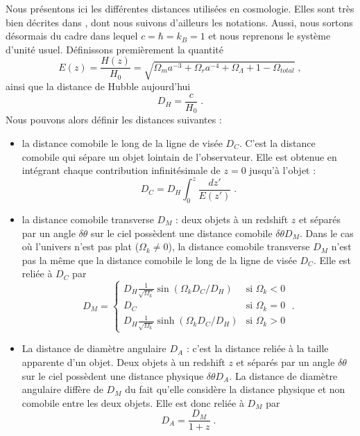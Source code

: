 \documentclass[11pt, twoside, a4paper, openright]{report}
\begin{document}
Nous présentons ici les différentes distances utilisées en cosmologie. Elles sont très bien décrites dans \textcite{Hogg1999}, dont nous suivons d'ailleurs les notations. Aussi, nous sortons désormais du cadre dans lequel $c = \hbar = k_{B} = 1$ et nous reprenons le système d'unité usuel. Définissons premièrement la quantité
\begin{equation}
  \label{eq:dist_ez}
  E(z) = \frac{H(z)}{H_0} 
  = \sqrt{\Omega_m a^{-3} + \Omega_r a^{-4} + \Omega_{\Lambda} + 1 - \Omega_{total}}  \; ,
\end{equation}
ainsi que la distance de Hubble aujourd'hui
\begin{equation}
  \label{eq:dist_hubble}
  D_H = \frac{c}{H_0}  \; .
\end{equation}
Nous pouvons alors définir les distances suivantes :
\begin{itemize}[label=$\bullet$]
\item la distance comobile le long de la ligne de visée $D_{C}$. C'est la distance comobile qui sépare un objet lointain de l'observateur. Elle est obtenue en intégrant chaque contribution infinitésimale de $z=0$ jusqu'à l'objet :
  \begin{equation}
    \label{eq:dist_como}
    D_{C} = D_H \int_0^z \frac{dz'}{E(z')}  \; .
  \end{equation}
\item la distance comobile transverse $D_M$ : deux objets à un redshift $z$ et séparés par un angle $\delta \theta$ sur le ciel possèdent une distance comobile $\delta \theta D_M$.
  Dans le cas où l'univers n'est pas plat ($\Omega_k \neq 0$), la distance comobile transverse $D_M$  n'est pas la même que la distance comobile le long de la ligne de visée $D_{C}$. Elle est reliée à $D_{C}$ par
  \begin{equation}
    \label{eq:dist_como_trans}
    D_M = \left\{
      \begin{array}{ll}
        D_H \frac{1}{\sqrt{\Omega_k}} \sin(\Omega_k D_C / D_H) & \mbox{si } \Omega_k < 0 \\
        D_C & \textrm{si } \Omega_k = 0 \\
        D_H \frac{1}{\sqrt{\Omega_k}} \sinh(\Omega_k D_C / D_H) & \mbox{si } \Omega_k > 0
      \end{array}
    \right. \; .
  \end{equation}
 
\item La distance de diamètre angulaire $D_A$ : c'est la distance reliée à la taille apparente d'un objet. Deux objets à un redshift $z$ et séparés par un angle $\delta \theta$ sur le ciel possèdent une distance physique $\delta \theta D_A$. La distance de diamètre angulaire diffère de $D_M$ du fait qu'elle considère la distance physique et non comobile entre les deux objets. Elle est donc reliée à $D_M$ par
  \begin{equation}
    \label{eq:dist_ang}
    D_A = \frac{D_M}{1+z}  \; .
  \end{equation}


\end{itemize}
\end{document}
